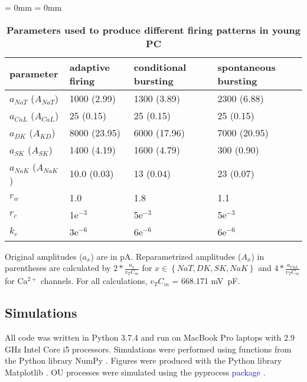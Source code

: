 \documentclass[10pt,letterpaper]{article}
\newcommand{\Ca}{Ca$^{2+}$}
\newcommand{\midsepremove}{\aboverulesep = 0mm \belowrulesep = 0mm}
\newcommand{\edit}[1]{\textcolor{blue}{#1}}
\begin{document}
\begin{table}[ht!]
\begin{center}
\caption{\textbf{Parameters used to produce different firing patterns in young PC}} 
\begin{footnotesize}
\midsepremove
\begin{tabular}{p{9em} p{9em}  p{9em}  p{9em}} %
\toprule
\textbf{parameter} & \textbf{adaptive \newline firing} & \textbf{conditional \newline bursting} & \textbf{spontaneous bursting} \\
\toprule
$a_{NaT}$ ($A_{NaT}$) & 1000 (2.99) & 1300 (3.89) & 2300 (6.88) \\
$a_{CaL}$ ($A_{CaL}$)& 25 (0.15) & 25 (0.15) & 25 (0.15) \\
$a_{DK}$ ($A_{KD}$)& 8000 (23.95) & 6000 (17.96) & 7000 (20.95) \\
$a_{SK}$ ($A_{SK}$)& 1400 (4.19) & 1600 (4.79) & 300 (0.90) \\
$a_{NaK}$ ($A_{NaK}$)& 10.0 (0.03) & 13 (0.04) & 23 (0.07) \\
$r_{w}$ & 1.0 & 1.8 & 1.1 \\
$r_{c}$ & 1e$^{-3}$ & 5e$^{-3}$ & 5e$^{-3}$ \\
$k_{c}$ & 3e$^{-6}$ & 6e$^{-6}$ & 6e$^{-6}$ \\
\bottomrule 
\end{tabular}
\begin{flushleft}
\footnotesize{Original amplitudes ($a_x$) are in pA. Reparametrized amplitudes ($A_x$) in parentheses are calculated by $2*\frac{a_x}{v_T C_m}$ for $x \in \left\{NaT,DK,SK,NaK\right\}$ and $4*\frac{a_{CaL}}{v_T C_m}$ for {\Ca} channels. For all calculations, $v_T C_m$ = 668.171 mV~pF.}
\end{flushleft}
\end{footnotesize}
\label{tab:regimes}
\end{center}
\end{table}

\subsection*{Simulations}
All code was written in Python 3.7.4 and run on MacBook Pro laptops with 2.9 GHz Intel Core i5 processors. Simulations were performed using functions from the Python library NumPy \cite{numpyHarris2020}. Figures were produced with the Python library Matplotlib \cite{hunter2007matplotlib}. OU processes were simulated using the pyprocess \edit{package} \cite{mondaca200PyProcess}.
\end{document}
